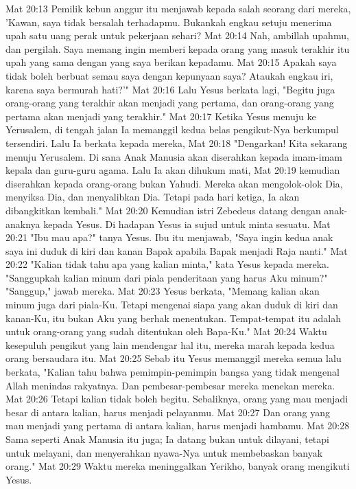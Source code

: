 Mat 20:13  Pemilik kebun anggur itu menjawab kepada salah seorang dari mereka, 'Kawan, saya tidak bersalah terhadapmu. Bukankah engkau setuju menerima upah satu uang perak untuk pekerjaan sehari?
Mat 20:14  Nah, ambillah upahmu, dan pergilah. Saya memang ingin memberi kepada orang yang masuk terakhir itu upah yang sama dengan yang saya berikan kepadamu.
Mat 20:15  Apakah saya tidak boleh berbuat semau saya dengan kepunyaan saya? Ataukah engkau iri, karena saya bermurah hati?'"
Mat 20:16  Lalu Yesus berkata lagi, "Begitu juga orang-orang yang terakhir akan menjadi yang pertama, dan orang-orang yang pertama akan menjadi yang terakhir."
Mat 20:17  Ketika Yesus menuju ke Yerusalem, di tengah jalan Ia memanggil kedua belas pengikut-Nya berkumpul tersendiri. Lalu Ia berkata kepada mereka,
Mat 20:18  "Dengarkan! Kita sekarang menuju Yerusalem. Di sana Anak Manusia akan diserahkan kepada imam-imam kepala dan guru-guru agama. Lalu Ia akan dihukum mati,
Mat 20:19  kemudian diserahkan kepada orang-orang bukan Yahudi. Mereka akan mengolok-olok Dia, menyiksa Dia, dan menyalibkan Dia. Tetapi pada hari ketiga, Ia akan dibangkitkan kembali."
Mat 20:20  Kemudian istri Zebedeus datang dengan anak-anaknya kepada Yesus. Di hadapan Yesus ia sujud untuk minta sesuatu.
Mat 20:21  "Ibu mau apa?" tanya Yesus. Ibu itu menjawab, "Saya ingin kedua anak saya ini duduk di kiri dan kanan Bapak apabila Bapak menjadi Raja nanti."
Mat 20:22  "Kalian tidak tahu apa yang kalian minta," kata Yesus kepada mereka. "Sanggupkah kalian minum dari piala penderitaan yang harus Aku minum?" "Sanggup," jawab mereka.
Mat 20:23  Yesus berkata, "Memang kalian akan minum juga dari piala-Ku. Tetapi mengenai siapa yang akan duduk di kiri dan kanan-Ku, itu bukan Aku yang berhak menentukan. Tempat-tempat itu adalah untuk orang-orang yang sudah ditentukan oleh Bapa-Ku."
Mat 20:24  Waktu kesepuluh pengikut yang lain mendengar hal itu, mereka marah kepada kedua orang bersaudara itu.
Mat 20:25  Sebab itu Yesus memanggil mereka semua lalu berkata, "Kalian tahu bahwa pemimpin-pemimpin bangsa yang tidak mengenal Allah menindas rakyatnya. Dan pembesar-pembesar mereka menekan mereka.
Mat 20:26  Tetapi kalian tidak boleh begitu. Sebaliknya, orang yang mau menjadi besar di antara kalian, harus menjadi pelayanmu.
Mat 20:27  Dan orang yang mau menjadi yang pertama di antara kalian, harus menjadi hambamu.
Mat 20:28  Sama seperti Anak Manusia itu juga; Ia datang bukan untuk dilayani, tetapi untuk melayani, dan menyerahkan nyawa-Nya untuk membebaskan banyak orang."
Mat 20:29  Waktu mereka meninggalkan Yerikho, banyak orang mengikuti Yesus.
